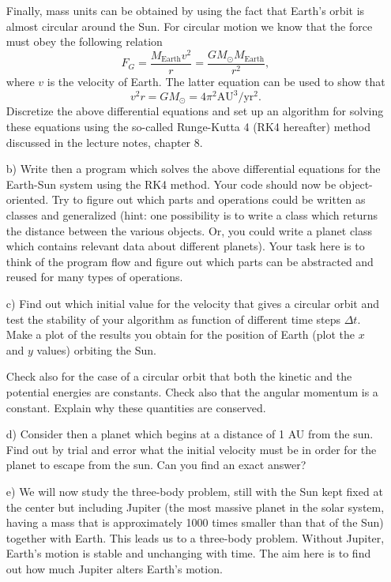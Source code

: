 \documentclass[a4wide,12pt]{article}
\begin{document}
\begin{enumerate}
Finally,  mass units can be obtained by using the fact that Earth's orbit is almost circular around the Sun.
For circular motion we know that the force must obey the following relation
\[
F_G= \frac{M_{\mathrm{Earth}}v^2}{r}=\frac{GM_{\odot}M_{\mathrm{Earth}}}{r^2},
\]
where $v$ is the velocity of Earth. 
The latter equation can be used to show that
\[
v^2r=GM_{\odot}=4\pi^2\mathrm{AU}^3/\mathrm{yr}^2.
\]
Discretize the above differential equations and set up an algorithm for solving these equations using the so-called 
Runge-Kutta 4 (RK4 hereafter)  method discussed in the lecture notes, chapter 8.
\item[b)]  Write then a program which solves the above differential equations for the Earth-Sun system
using the RK4 method. 
Your code should now be object-oriented. Try to figure out which parts and operations could be written as classes
and generalized (hint: one possibility is to write a class which returns the distance between the various objects. Or, you could write a planet class which contains relevant data about different planets).  Your task here is to think of the program flow and figure out which parts can be abstracted and reused for many types of operations. 
\item[c)]
Find out which initial value for the velocity that gives a circular orbit
and test the stability of your algorithm as function of different time steps $\Delta t$. 
Make a plot of the results you obtain for the position of Earth (plot the $x$ and $y$ values) orbiting  the Sun.

Check also for the case of a circular orbit that both the kinetic and the potential energies are constants.
Check also that the angular momentum is a constant. Explain why these quantities
are conserved.


\item[d)] Consider then a planet which begins at a distance of 1 AU from the sun. Find out by trial and error
what the initial velocity must be in order for the planet to escape from the sun.  Can you find an exact answer?

\item[e)]  We will now study the three-body problem, still with the Sun kept fixed at the center but 
including Jupiter (the most massive planet in the solar system, having a mass that is approximately 1000 times
smaller than that of the Sun) together with Earth. This leads us to a three-body problem. Without Jupiter, Earth's motion is stable and unchanging with time. The aim here is to find out how much Jupiter alters Earth's motion.


\end{enumerate}
\end{document}
